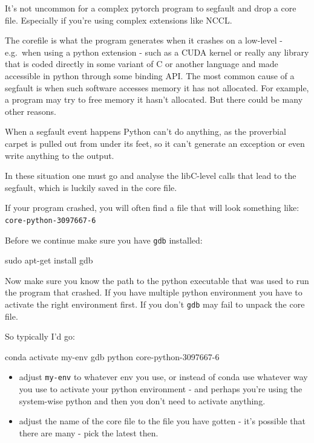 \documentclass[
]{report}
\newenvironment{Shaded}{\begin{snugshade}}{\end{snugshade}}
\newcommand{\ExtensionTok}[1]{\textcolor[rgb]{0.00,0.23,0.31}{#1}}
\newcommand{\FunctionTok}[1]{\textcolor[rgb]{0.28,0.35,0.67}{#1}}
\newcommand{\NormalTok}[1]{\textcolor[rgb]{0.00,0.23,0.31}{#1}}
\providecommand{\tightlist}{%
  \setlength{\itemsep}{0pt}\setlength{\parskip}{0pt}}\usepackage{longtable,booktabs,array}
\begin{document}
It's not uncommon for a complex pytorch program to segfault and drop a
core file. Especially if you're using complex extensions like NCCL.

The corefile is what the program generates when it crashes on a
low-level - e.g.~when using a python extension - such as a CUDA kernel
or really any library that is coded directly in some variant of C or
another language and made accessible in python through some binding API.
The most common cause of a segfault is when such software accesses
memory it has not allocated. For example, a program may try to free
memory it hasn't allocated. But there could be many other reasons.

When a segfault event happens Python can't do anything, as the
proverbial carpet is pulled out from under its feet, so it can't
generate an exception or even write anything to the output.

In these situation one must go and analyse the libC-level calls that
lead to the segfault, which is luckily saved in the core file.

If your program crashed, you will often find a file that will look
something like: \texttt{core-python-3097667-6}

Before we continue make sure you have \texttt{gdb} installed:

\begin{Shaded}
\begin{Highlighting}[]
\FunctionTok{sudo}\NormalTok{ apt{-}get install gdb}
\end{Highlighting}
\end{Shaded}

Now make sure you know the path to the python executable that was used
to run the program that crashed. If you have multiple python environment
you have to activate the right environment first. If you don't
\texttt{gdb} may fail to unpack the core file.

So typically I'd go:

\begin{Shaded}
\begin{Highlighting}[]
\ExtensionTok{conda}\NormalTok{ activate my{-}env}
\FunctionTok{gdb}\NormalTok{ python core{-}python{-}3097667{-}6}
\end{Highlighting}
\end{Shaded}

\begin{itemize}
\tightlist
\item
  adjust \texttt{my-env} to whatever env you use, or instead of conda
  use whatever way you use to activate your python environment - and
  perhaps you're using the system-wise python and then you don't need to
  activate anything.
\item
  adjust the name of the core file to the file you have gotten - it's
  possible that there are many - pick the latest then.
\end{itemize}
\end{document}
